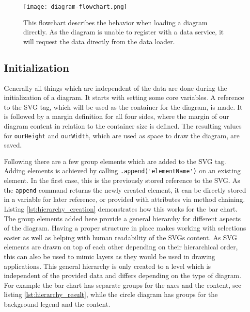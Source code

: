 \begin{figure}
    \texttt{[image: diagram-flowchart.png]}
    \captionsetup{width=0.9\textwidth}
    \caption[diagram-flowchart]{This flowchart describes the behavior when loading a diagram directly. As the diagram is unable to register with a data service, it will request the data directly from the data loader.}
    \label{fig:diagram-flowchart}
\end{figure}

\subsection{Initialization}
Generally all things which are independent of the data are done during the initialization of a diagram. It starts with setting some core variables. A reference to the SVG tag, which will be used as the container for the diagram, is made. It is followed by a margin definition for all four sides, where the margin of our diagram content in relation to the container size is defined. The resulting values for \verb|ourHeight| and \verb|ourWidth|, which are used as space to draw the diagram, are saved. 

Following there are a few group elements which are added to the SVG tag. Adding elements is achieved by calling \verb|.append('elementName')| on an existing element. In the first case, this is the previously stored reference to the SVG. As the \verb|append| command returns the newly created element, it can be directly stored in a variable for later reference, or provided with attributes via method chaining. Listing \ref{lst:hierarchy_creation} demonstrates how this works for the bar chart. The group elements added here provide a general hierarchy for different aspects of the diagram. Having a proper structure in place makes working with selections easier as well as helping with human readability of the SVGs content. As SVG elements are drawn on top of each other depending on their hierarchical order, this can also be used to mimic layers as they would be used in drawing applications. This general hierarchy is only created to a level which is independent of the provided data and differs depending on the type of diagram. For example the bar chart has separate groups for the axes and the content, see listing \ref{lst:hierarchy_result}, while the circle diagram has groups for the background legend and the content.

